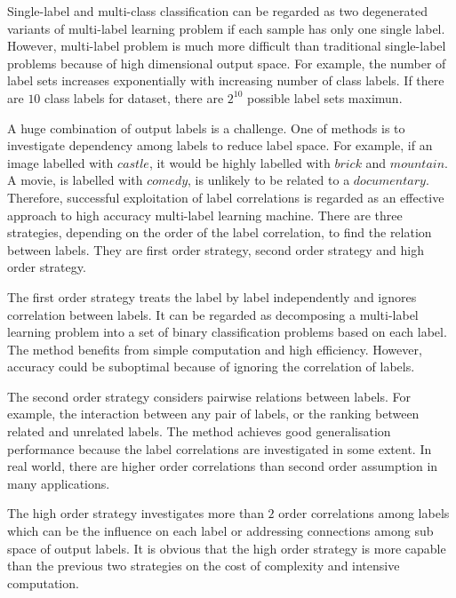 Single-label and multi-class classification can be regarded as two degenerated variants of multi-label learning problem if each sample has only one single label. However, multi-label problem is much more difficult than traditional single-label problems because of high dimensional output space. For example, the number of label sets increases exponentially with increasing number of class labels. If there are $10$ class labels for dataset, there are $2^{10}$ possible label sets maximun.

A huge combination of output labels is a challenge. One of methods is to investigate dependency among labels to reduce label space. For example, if an image labelled with $castle$, it would be highly labelled with $brick$ and $mountain$. A movie, is labelled with $comedy$, is unlikely to be related to a $documentary$. Therefore, successful exploitation of label correlations is regarded as an effective approach to high accuracy multi-label learning machine. There are three strategies, depending on the order of the label correlation, to find the relation between labels. They are first order strategy, second order strategy and high order strategy. 

The first order strategy treats the label by label independently and ignores correlation between labels. It can be regarded as decomposing a multi-label learning problem into a set of binary classification problems based on each label. The method benefits from simple computation and high efficiency. However, accuracy could be suboptimal because of ignoring the correlation of labels.

The second order strategy considers pairwise relations between labels. For example, the interaction between any pair of labels, or the ranking between related and unrelated labels. The method achieves good generalisation performance because the label correlations are investigated in some extent. In real world, there are higher order correlations than second order assumption in many applications.

The high order strategy investigates more than $2$ order correlations among labels which can be the influence on each label or addressing connections among sub space of output labels. It is obvious that the high order strategy is more capable than the previous two strategies on the cost of complexity and intensive computation.

